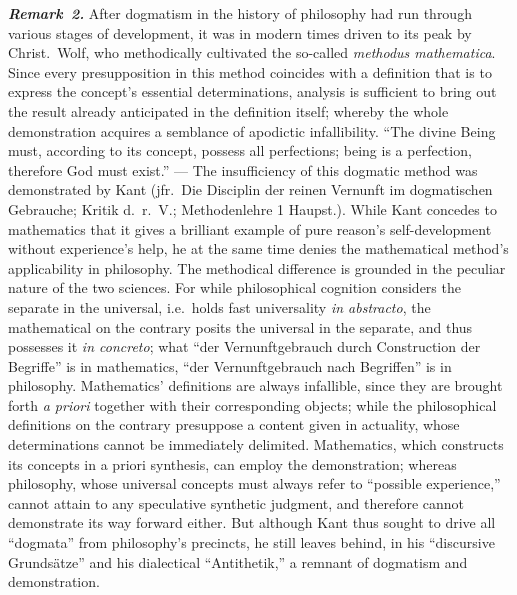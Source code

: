 \documentclass[12pt]{book}
\newcommand{\anm}[1]{\emph{\textbf{Remark~#1.}}}
\begin{document}
\anm{2} After dogmatism in the history of philosophy had run through various
stages of development, it was in modern times driven to its peak by Christ.\
Wolf, who methodically cultivated the so-called \textit{methodus
mathematica}. Since every presupposition in this method coincides with a
definition that is to express the concept's essential determinations,
analysis is sufficient to bring out the result already anticipated in the
definition itself; whereby the whole demonstration acquires a semblance of
apodictic infallibility. ``The divine Being must, according to its concept,
possess all perfections; being is a perfection, therefore God must exist.''
--- The insufficiency of this dogmatic method was demonstrated by Kant
(jfr.\ Die Disciplin der reinen Vernunft im dogmatischen Gebrauche; Kritik
d.\ r.\ V.; Methodenlehre 1 Haupst.). While Kant concedes to mathematics
that it gives a brilliant example of pure reason's self-development without
experience's help, he at the same time denies the mathematical method's
applicability in philosophy. The methodical difference is grounded in the
peculiar nature of the two sciences. For while philosophical cognition
considers the separate in the universal, i.e.\ holds fast universality
\textit{in abstracto}, the mathematical on the contrary posits the universal
in the separate, and thus possesses it \textit{in concreto}; what ``der
Vernunftgebrauch durch Construction der Begriffe'' is in mathematics, ``der
Vernunftgebrauch nach Begriffen'' is in philosophy. Mathematics' definitions
are always infallible, since they are brought forth \textit{a priori}
together with their corresponding objects; while the philosophical
definitions on the contrary presuppose a content given in actuality, whose
determinations cannot be immediately delimited. Mathematics, which
constructs its concepts in a priori synthesis, can employ the demonstration;
whereas philosophy, whose universal concepts must always refer to
``possible experience,'' cannot attain to any speculative synthetic
judgment, and therefore cannot demonstrate its way forward either. But
although Kant thus sought to drive all ``dogmata'' from philosophy's
precincts, he still leaves behind, in his ``discursive Grundsätze'' and his
dialectical ``Antithetik,'' a remnant of dogmatism and demonstration.
\end{document}

